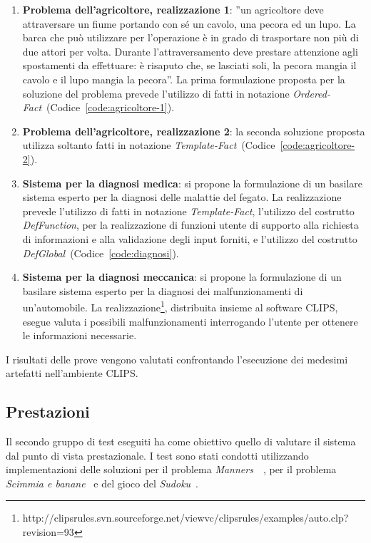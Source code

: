 \begin{enumerate}
	\item \textbf{Problema dell'agricoltore, realizzazione 1}: ''un agricoltore deve attraversare un fiume portando con sé un cavolo, una pecora ed un lupo. La barca che può utilizzare per l'operazione è in grado di trasportare non più di due attori per volta. Durante l'attraversamento deve prestare attenzione agli spostamenti da effettuare: è risaputo che, se lasciati soli, la pecora mangia il cavolo e il lupo mangia la pecora''. La prima formulazione proposta per la soluzione del problema prevede l'utilizzo di fatti in notazione \emph{Ordered-Fact}~(Codice~\ref{code:agricoltore-1}).
	
	\item \textbf{Problema dell'agricoltore, realizzazione 2}: la seconda soluzione proposta utilizza soltanto fatti in notazione \emph{Template-Fact}~(Codice~\ref{code:agricoltore-2}).

	\item \textbf{Sistema per la diagnosi medica}: si propone la formulazione di un basilare sistema esperto per la diagnosi delle malattie del fegato. La realizzazione prevede l'utilizzo di fatti in notazione \emph{Template-Fact}, l'utilizzo del costrutto \emph{DefFunction}, per la realizzazione di funzioni utente di supporto alla richiesta di informazioni e alla validazione degli input forniti, e l'utilizzo del costrutto \emph{DefGlobal}~(Codice~\ref{code:diagnosi}).
	
	\item \textbf{Sistema per la diagnosi meccanica}: si propone la formulazione di un basilare sistema esperto per la diagnosi dei malfunzionamenti di un'automobile. La realizzazione\footnote{http://clipsrules.svn.sourceforge.net/viewvc/clipsrules/examples/auto.clp?revision=93}, distribuita insieme al software CLIPS, esegue valuta i possibili malfunzionamenti interrogando l'utente per ottenere le informazioni necessarie.

\end{enumerate}

I risultati delle prove vengono valutati confrontando l'esecuzione dei medesimi artefatti nell'ambiente CLIPS.

\subsection{Prestazioni}

Il secondo gruppo di test eseguiti ha come obiettivo quello di valutare il sistema dal punto di vista prestazionale. I test sono stati condotti utilizzando implementazioni delle soluzioni per il problema \emph{Manners}~\cite{brantetal91}~\cite{ops5bench}, per il problema \emph{Scimmia e banane}~\cite{clipsmab} e del gioco del \emph{Sudoku}~\cite{clipssudoku}.

